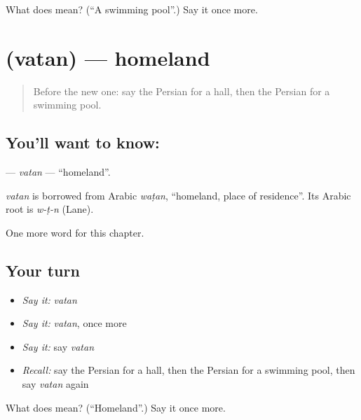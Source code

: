 \begin{tcolorbox}[breakable,colback=teal!4,colframe=teal!35!black,title={Before you move on}]
What does  mean? (\textquotedblleft{}A swimming pool\textquotedblright{}.) Say it once more.
\end{tcolorbox}
\section[\texorpdfstring{\fa{وطن} (vatan)}{وطن (vatan)}]{ (vatan) — homeland}

\label{lesson:FA-C231-vatan}



\begin{quote}
Before the new one: say the Persian for a hall, then the Persian for a swimming pool.
\end{quote}

\subsection*{You'll want to know: }
\textbf{} — \emph{vatan} — \textquotedblleft{}homeland\textquotedblright{}.

\begin{cousinweb}
\emph{vatan} is borrowed from Arabic \emph{waṭan}, \textquotedblleft{}homeland, place of residence\textquotedblright{}. Its Arabic root is \emph{w-ṭ-n} (Lane).
\end{cousinweb}

\begin{grammarlens}[title={What you've built}]
One more word for this chapter.
\end{grammarlens}

\subsection*{Your turn}
\begin{itemize}
\raggedright
  \item \emph{Say it:} \emph{vatan}
  \item \emph{Say it:} \emph{vatan}, once more
  \item \emph{Say it:} say \emph{vatan}
  \item \emph{Recall:} say the Persian for a hall, then the Persian for a swimming pool, then say \emph{vatan} again
\end{itemize}

\begin{tcolorbox}[breakable,colback=teal!4,colframe=teal!35!black,title={Before you move on}]
What does  mean? (\textquotedblleft{}Homeland\textquotedblright{}.) Say it once more.
\end{tcolorbox}
